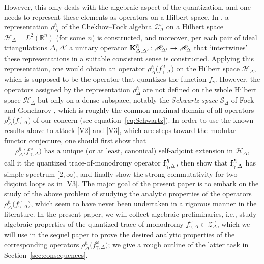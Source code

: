 \documentclass[10pt,a4paper]{amsart}
\numberwithin{equation}{section}
\theoremstyle{definition}
\begin{document}
However, this only deals with the algebraic aspect of the quantization, and one needs to represent these elements as operators on a Hilbert space. In \cite{ F97,CF, FG09, Kim_irreducible}, a representation $\rho^\hbar_\Delta$ of the Chekhov--Fock algebra $\mathcal{Z}^\omega_\Delta$ on a Hilbert space $\mathscr{H}_\Delta = L^2(\mathbb{R}^n)$ (for some $n$) is constructed, and moreover, per each pair of ideal triangulations $\Delta,\Delta'$ a unitary operator ${\bf K}^\hbar_{\Delta,\Delta'} \colon \mathscr{H}_{\Delta'} \to \mathscr{H}_\Delta$ that `intertwines' these representations in a suitable consistent sense is constructed. Applying this representation, one would obtain an operator $\rho^\hbar_\Delta\bigl(f^\omega_{\gamma,\Delta}\bigr)$ on the Hilbert space $\mathscr{H}_\Delta$, which is supposed to be the operator that quantizes the function $f_\gamma$. However, the operators assigned by the representation $\rho^\hbar_\Delta$ are not defined on the whole Hilbert space $\mathscr{H}_\Delta$ but only on a dense subspace, notably the {\em Schwartz space} $\mathscr{S}_\Delta$ of Fock and Goncharov \cite[Definition~5.2]{FG09}, which is roughly the common maximal domain of all operators $\rho^\hbar_\Delta\bigl(f^\omega_{\gamma,\Delta}\bigr)$ of our concern (see equation~\eqref{eq:Schwartz}).
In order to use the known results above to attack \ref{V2} and \ref{V3}, which are steps toward the modular functor conjecture, one should first show that
\begin{align}
\label{eq:intro_essential_uniqueness}
\mbox{$\rho^\hbar_\Delta\bigl(f^\omega_{\gamma,\Delta}\bigr)$ has a unique (or at least, canonical) self-adjoint extension in $\mathscr{H}_\Delta$,}
\end{align}
call it the quantized trace-of-monodromy operator ${\bf f}^\hbar_{\gamma,\Delta}$, then show that ${\bf f}^\hbar_{\gamma,\Delta}$ has simple spectrum $[2,\infty)$, and finally show the strong commutativity for two disjoint loops as in \ref{V3}.
The major goal of the present paper is to embark on the study of the above problem of studying the analytic properties of the operators $\rho^\hbar_\Delta\bigl(f^\omega_{\gamma,\Delta}\bigr)$, which seem to have never been undertaken in a rigorous manner in the literature. In the present paper, we will collect algebraic preliminaries, i.e., study algebraic properties of the quantized trace-of-monodromy $f^\omega_{\gamma,\Delta} \in \mathcal{Z}^\omega_\Delta$, which we will use in the sequel paper \cite{sequel} to prove the desired analytic properties of the corresponding operators $\rho^\hbar_\Delta\bigl(f^\omega_{\gamma,\Delta}\bigr)$; we give a rough outline of the latter task in Section~\ref{sec:consequences}.
\end{document}
